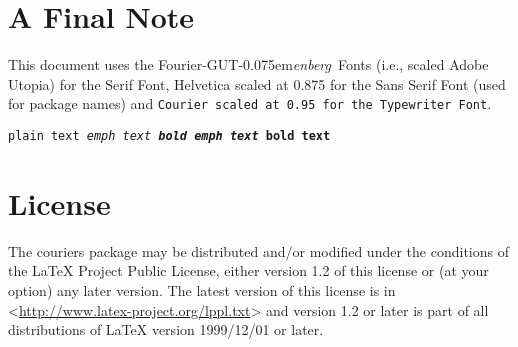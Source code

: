 \documentclass{article}
\newcommand{\fourier}{Fourier-GUT\kern-0.075em\textit{enberg}}
\begin{document}
\section{A Final Note}

This document uses the \fourier\ Fonts (i.e., scaled Adobe Utopia) for the Serif Font, \textsf{Helvetica scaled at 0.875 for the Sans Serif Font (used for package names)} and \texttt{Courier scaled at 0.95 for the Typewriter Font}.

\begin{center}
\texttt{plain text \emph{emph text \textbf{bold emph text}} \textbf{bold text}}
\end{center}

\section{License}
The couriers package may be distributed and/or modified under the conditions of the LaTeX Project Public License, either version 1.2 of this license or (at your option) any later version. The latest version of this license is in <\url{http://www.latex-project.org/lppl.txt}> and version 1.2 or later is part of all distributions of LaTeX version 1999/12/01 or later.
\end{document}
